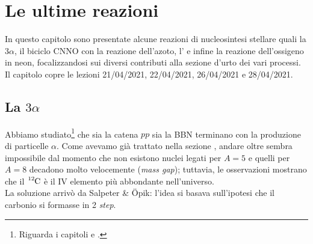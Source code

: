 \chapter{Le ultime reazioni}
In questo capitolo sono presentate alcune reazioni di nucleosintesi stellare quali la 3$\alpha$, il biciclo CNNO con la reazione dell'azoto, l' e infine la reazione dell'ossigeno in neon, focalizzandosi sui diversi contributi alla sezione d'urto dei vari processi. Il capitolo copre le lezioni 21/04/2021, 22/04/2021, 26/04/2021 e 28/04/2021. 

\section{La $3\alpha$}
Abbiamo studiato\footnote{Riguarda i capitoli  e .} che sia la catena $pp$ sia la BBN terminano con la produzione di particelle $\alpha$. Come avevamo già trattato nella sezione , andare oltre sembra impossibile dal momento che non esistono nuclei legati per $A=5$ e quelli per $A=8$ decadono molto velocemente (\textit{mass gap}); tuttavia, le osservazioni mostrano che il $\ce{^{12}C}$ è il IV elemento più abbondante nell'universo.\\ 
La soluzione arrivò da Salpeter \& \"{O}pik: l'idea si basava sull'ipotesi che il carbonio si formasse in 2 \textit{step}.
